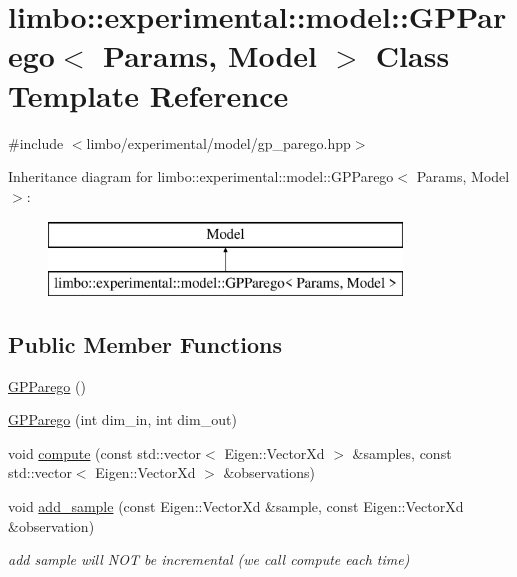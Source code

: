 \hypertarget{classlimbo_1_1experimental_1_1model_1_1_g_p_parego}{}\section{limbo\+:\+:experimental\+:\+:model\+:\+:G\+P\+Parego$<$ Params, Model $>$ Class Template Reference}
\label{classlimbo_1_1experimental_1_1model_1_1_g_p_parego}


{\ttfamily \#include $<$limbo/experimental/model/gp\+\_\+parego.\+hpp$>$}

Inheritance diagram for limbo\+:\+:experimental\+:\+:model\+:\+:G\+P\+Parego$<$ Params, Model $>$\+:\begin{figure}[H]
\begin{center}
\leavevmode
\includegraphics[height=2.000000cm]{classlimbo_1_1experimental_1_1model_1_1_g_p_parego}
\end{center}
\end{figure}
\subsection*{Public Member Functions}
\begin{DoxyCompactItemize}
\item 
\hyperlink{classlimbo_1_1experimental_1_1model_1_1_g_p_parego_ac351d6798add22da5c6dd58ac4a00723}{G\+P\+Parego} ()
\item 
\hyperlink{classlimbo_1_1experimental_1_1model_1_1_g_p_parego_a1f0eb578140f01874b13bfca124c085c}{G\+P\+Parego} (int dim\+\_\+in, int dim\+\_\+out)
\item 
void \hyperlink{classlimbo_1_1experimental_1_1model_1_1_g_p_parego_a72a42fd7f4617395296b703eb89ad30f}{compute} (const std\+::vector$<$ Eigen\+::\+Vector\+Xd $>$ \&samples, const std\+::vector$<$ Eigen\+::\+Vector\+Xd $>$ \&observations)
\item 
void \hyperlink{classlimbo_1_1experimental_1_1model_1_1_g_p_parego_a1203886482ddc7939ff1d22f0da20772}{add\+\_\+sample} (const Eigen\+::\+Vector\+Xd \&sample, const Eigen\+::\+Vector\+Xd \&observation)
\begin{DoxyCompactList}\small\item\em add sample will N\+OT be incremental (we call compute each time) \end{DoxyCompactList}\end{DoxyCompactItemize}


